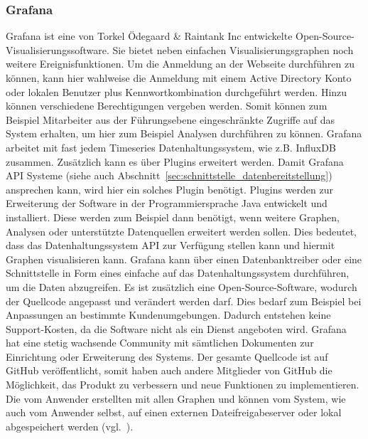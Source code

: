 \subsubsection{Grafana}
\label{subsubsec:grafana}
Grafana ist eine von Torkel Ödegaard \& Raintank Inc entwickelte
Open\hyp{}Source\hyp{}Visualisierungssoftware. Sie bietet neben einfachen
Visualisierungsgraphen noch weitere Ereignisfunktionen. Um die Anmeldung an der
Webseite durchführen zu können, kann hier wahlweise die Anmeldung mit
einem \gls{Active Directory} Konto oder lokalen Benutzer plus
Kennwortkombination durchgeführt werden. Hinzu können verschiedene
Berechtigungen vergeben werden. Somit können zum Beispiel Mitarbeiter aus der
Führungsebene eingeschränkte Zugriffe auf das System erhalten, um hier zum
Beispiel Analysen durchführen zu können. Grafana arbeitet mit fast jedem
Timeseries Datenhaltungssystem, wie z.B. InfluxDB zusammen. Zusätzlich kann es
über Plugins erweitert werden. Damit Grafana \gls{API} Systeme (siehe auch
Abschnitt~\ref{sec:schnittstelle_datenbereitstellung}) ansprechen kann, wird
hier ein solches Plugin benötigt. Plugins werden zur Erweiterung der Software
in der Programmiersprache Java entwickelt und installiert. Diese werden zum
Beispiel dann benötigt, wenn weitere Graphen, Analysen oder unterstützte
Datenquellen erweitert werden sollen. Dies bedeutet, dass das
Datenhaltungssystem \gls{API}  zur Verfügung
stellen kann und hiermit Graphen visualisieren kann. Grafana kann über einen
\gls{Datenbanktreiber} oder eine Schnittstelle in Form eines
 einfache  auf das
Datenhaltungssystem durchführen, um die Daten abzugreifen.
Es ist zusätzlich eine Open\hyp{}Source\hyp{}Software, wodurch der Quellcode
angepasst und verändert werden darf. Dies bedarf zum Beispiel bei Anpassungen
an bestimmte Kundenumgebungen. Dadurch entstehen keine
Support\hyp{}Kosten, da die Software nicht als ein Dienst angeboten wird.
Grafana hat eine stetig wachsende Community mit sämtlichen Dokumenten zur
Einrichtung oder Erweiterung des Systems. Der gesamte Quellcode ist auf
\gls{GitHub} veröffentlicht, somit haben auch andere Mitglieder von
\gls{GitHub} die Möglichkeit, das Produkt zu verbessern und neue Funktionen zu
implementieren. Die vom Anwender erstellten  mit
allen Graphen und  können vom System, wie auch
vom Anwender selbst, auf einen externen Dateifreigabeserver oder lokal
abgespeichert werden (vgl.~\cite{grafana}).

